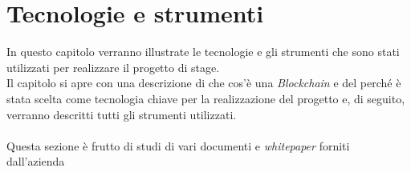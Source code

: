 
\chapter{Tecnologie e strumenti}
\label{cap:tecnologie_e_strumenti}
In questo capitolo verranno illustrate le tecnologie e gli strumenti che sono stati utilizzati per realizzare il progetto di stage.\\
Il capitolo si apre con una descrizione di che cos'è una \textit{Blockchain} e del perché è stata scelta come tecnologia chiave per la realizzazione del progetto e, di seguito, verranno descritti tutti gli strumenti utilizzati.\\\\
Questa sezione è frutto di studi di vari documenti e \textit{whitepaper} forniti dall'azienda\cite{spidchain_whitepaper}\cite{SSID}\cite{jolocom_whitepaper}\cite{ITF_gartner}\cite{hashgraph_whitepaper}
